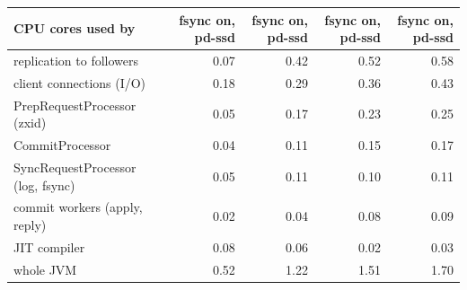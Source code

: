 \begin{tabular}{@{}lrrrr@{}}
\toprule
CPU cores used by & fsync on, pd-ssd & fsync on, pd-ssd & fsync on, pd-ssd & fsync on, pd-ssd \\
\midrule
replication to followers & 0.07 & 0.42 & 0.52 & 0.58 \\
client connections (I/O) & 0.18 & 0.29 & 0.36 & 0.43 \\
PrepRequestProcessor (zxid) & 0.05 & 0.17 & 0.23 & 0.25 \\
CommitProcessor & 0.04 & 0.11 & 0.15 & 0.17 \\
SyncRequestProcessor (log, fsync) & 0.05 & 0.11 & 0.10 & 0.11 \\
commit workers (apply, reply) & 0.02 & 0.04 & 0.08 & 0.09 \\
JIT compiler & 0.08 & 0.06 & 0.02 & 0.03 \\
whole JVM & 0.52 & 1.22 & 1.51 & 1.70 \\
\bottomrule
\end{tabular}
